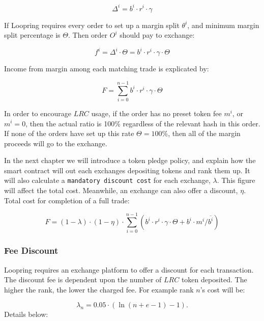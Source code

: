\documentclass[UTF8,nofonts]{article}
\begin{document}
\begin{equation*}
\Delta^i = b^i \cdot r^i \cdot \gamma
\end{equation*}

If Loopring requires every order to set up a margin split $\theta^i$, and minimum margin split percentage is $\Theta$. Then order $O^i$ should pay to exchange: 


\begin{equation*}
f^i = \Delta^i \cdot \Theta = b^i \cdot r^i \cdot \gamma \cdot \Theta
\end{equation*}

Income from margin among each matching trade is explicated by:

\begin{equation*}
F = \sum^{n-1}_{i=0} b^i \cdot r^i \cdot \gamma \cdot \Theta
\end{equation*}

In order to encourage $LRC$ usage, if the order has no preset token fee $m^i$, or $m^i=0$, then the actual ratio is 100\% regardless of the relevant hash in this order. If none of the orders have set up this rate $\Theta=100\%$, then all of the margin proceeds will go to the exchange.

In the next chapter we will introduce a token pledge policy, and explain how the smart contract will out each exchanges depositing tokens and rank them up. It will also calculate a \texttt{mandatory discount cost} for each exchange, $\lambda$. This figure will affect the total cost. Meanwhile, an exchange can also offer a discount, $\eta$. Total cost for completion of a full trade: 

\begin{equation*}
F =(1-\lambda)\cdot (1-\eta) \cdot \sum^{n-1}_{i=0} (b^i \cdot r^i \cdot \gamma \cdot \Theta + b^i \cdot m^i / \overline{b^i})
\end{equation*}


\subsubsection{Fee Discount}
Loopring requires an exchange platform to offer a discount for each transaction. The discount fee is dependent upon the number of $LRC$ token deposited. The higher the rank, the lower the charged fee. For example rank $n$'s cost will be:

$$\lambda_{n} = 0.05\cdot(\ln (n+e-1) - 1)\text{.}$$
Details below:
\end{document}
